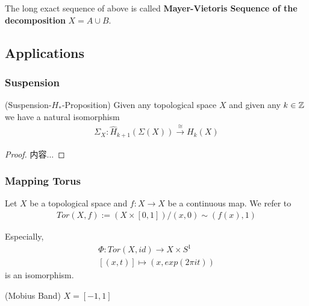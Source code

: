 \documentclass[Total.tex]{subfiles}
\begin{document}
		\begin{Def}
			The long exact sequence of above is called \textbf{Mayer-Vietoris Sequence of the decomposition} $X=A\cup B$.
		\end{Def}
		\subsection{Applications}
			\subsubsection{Suspension}
			\begin{proposition}
				(Suspension-$H_*$-Proposition) Given any topological space $X$ and given any $k\in \mathbb{Z}$ we have a natural isomorphism
				\begin{gather*}
					\Sigma_X:\hat{H}_{k+1}(\Sigma(X))\stackrel{\cong}{\rightarrow} H_k(X)
				\end{gather*}
			\end{proposition}
			\begin{proof}
				内容...
			\end{proof}
			
			\subsubsection{Mapping Torus}
			\begin{Def}
				Let $X$ be a topological space and $f:X\rightarrow X$ be a continuous map. We refer to
				\begin{gather*}
					Tor(X,f):=(X\times [0,1])/(x,0)\sim (f(x),1)
				\end{gather*}
			\end{Def}
			Especially, 
			\begin{gather*}
				\Phi:Tor(X,id)\rightarrow X\times S^1\\
				[(x,t)]\mapsto (x,exp(2\pi it))
			\end{gather*}
			is an isomorphism.
			
			\begin{example}
				(Mobius Band) $X=[-1,1]$
			\end{example}
			
\end{document}
